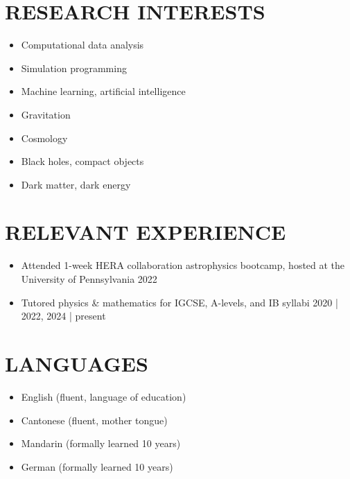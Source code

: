 \documentclass[a4paper,10pt]{extarticle}
\begin{document}
\section*{RESEARCH INTERESTS}
\begin{itemize}
    \item Computational data analysis

    \item Simulation programming

    \item Machine learning, artificial intelligence
    
    \item Gravitation

    \item Cosmology

    \item Black holes, compact objects

    \item Dark matter, dark energy
\end{itemize}


\section*{RELEVANT EXPERIENCE}
\begin{itemize}
    \item Attended 1-week HERA collaboration astrophysics bootcamp, hosted at the University of Pennsylvania \hfill 2022

    \item Tutored physics \& mathematics for IGCSE, A-levels, and IB syllabi \hfill 2020 | 2022, 2024 | present
\end{itemize}


\section*{LANGUAGES}
\begin{itemize}
    \item English (fluent, language of education)

    \item Cantonese (fluent, mother tongue)

    \item Mandarin (formally learned 10 years)

    \item German (formally learned 10 years)
\end{itemize}
\end{document}
